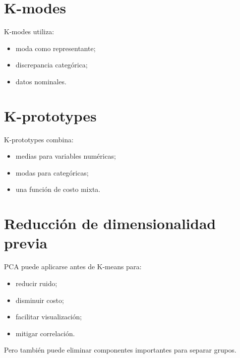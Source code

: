 \documentclass[
  spanish,
  10.5pt,
  letterpaper,
  DIV=11,
  numbers=noendperiod,
  oneside,
  open=any]{scrreprt}
\providecommand{\tightlist}{%
  \setlength{\itemsep}{0pt}\setlength{\parskip}{0pt}}
\theoremstyle{definition}
\theoremstyle{definition}
\theoremstyle{plain}
\theoremstyle{remark}
\begin{document}
\section*{K-modes}\label{k-modes}


K-modes utiliza:

\begin{itemize}
\tightlist
\item
  moda como representante;
\item
  discrepancia categórica;
\item
  datos nominales.
\end{itemize}

\section*{K-prototypes}\label{k-prototypes}


K-prototypes combina:

\begin{itemize}
\tightlist
\item
  medias para variables numéricas;
\item
  modas para categóricas;
\item
  una función de costo mixta.
\end{itemize}

\section*{Reducción de dimensionalidad
previa}\label{reducciuxf3n-de-dimensionalidad-previa}


PCA puede aplicarse antes de K-means para:

\begin{itemize}
\tightlist
\item
  reducir ruido;
\item
  disminuir costo;
\item
  facilitar visualización;
\item
  mitigar correlación.
\end{itemize}

Pero también puede eliminar componentes importantes para separar grupos.
\end{document}
